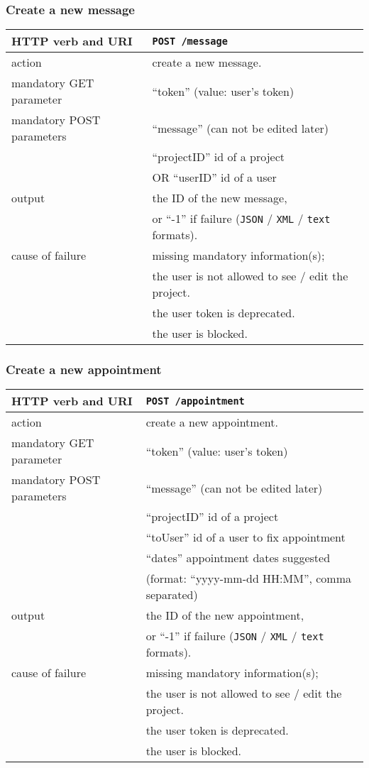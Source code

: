 \subsubsection{Create a new message}
\begin{tabular}{ | l | l | }
	\hline
	HTTP verb and URI & \texttt{POST /message} \\
	\hline
	action & create a new message. \\
	\hline
	mandatory GET parameter & ``token'' (value: user's token) \\
	\hline
	mandatory POST parameters & ``message'' (can not be edited later) \\
	\space & ``projectID'' id of a project \\
	\space & OR ``userID'' id of a user \\
	\hline
	output & the ID of the new message, \\
	\space & or ``-1'' if failure (\texttt{JSON} / \texttt{XML} / \texttt{text} formats). \\
	\hline
	cause of failure & missing mandatory information(s); \\
	\space & the user is not allowed to see / edit the project. \\
	\space & the user token is deprecated. \\
	\space & the user is blocked. \\
	\hline
\end{tabular}

\subsubsection{Create a new appointment}
\begin{tabular}{ | l | l | }
	\hline
	HTTP verb and URI & \texttt{POST /appointment} \\
	\hline
	action & create a new appointment. \\
	\hline
	mandatory GET parameter & ``token'' (value: user's token) \\
	\hline
	mandatory POST parameters & ``message'' (can not be edited later) \\
	\space & ``projectID'' id of a project \\		
	\space & ``toUser'' id of a user to fix appointment \\
	\space & ``dates'' appointment dates suggested \\
	\space & (format: ``yyyy-mm-dd HH:MM'', comma separated) \\
	\hline
	output & the ID of the new appointment, \\
	\space & or ``-1'' if failure (\texttt{JSON} / \texttt{XML} / \texttt{text} formats). \\
	\hline
	cause of failure & missing mandatory information(s);  \\
	\space & the user is not allowed to see / edit the project. \\
	\space & the user token is deprecated. \\
	\space & the user is blocked. \\
	\hline
\end{tabular}

